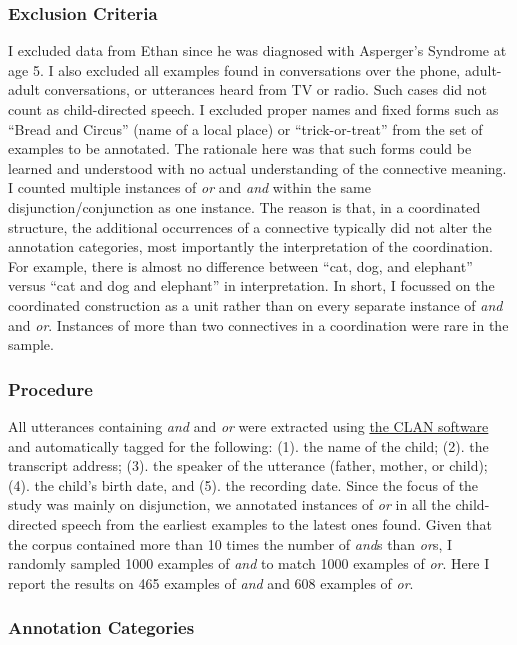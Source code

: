 \documentclass[oneside]{report}
\theoremstyle{definition}
\theoremstyle{definition}
\theoremstyle{definition}
\theoremstyle{remark}
\begin{document}
\subsubsection{Exclusion Criteria}\label{exclusion-criteria-1}

I excluded data from Ethan since he was diagnosed with Asperger's
Syndrome at age 5. I also excluded all examples found in conversations
over the phone, adult-adult conversations, or utterances heard from TV
or radio. Such cases did not count as child-directed speech. I excluded
proper names and fixed forms such as ``Bread and Circus'' (name of a
local place) or ``trick-or-treat'' from the set of examples to be
annotated. The rationale here was that such forms could be learned and
understood with no actual understanding of the connective meaning. I
counted multiple instances of \emph{or} and \emph{and} within the same
disjunction/conjunction as one instance. The reason is that, in a
coordinated structure, the additional occurrences of a connective
typically did not alter the annotation categories, most importantly the
interpretation of the coordination. For example, there is almost no
difference between ``cat, dog, and elephant'' versus ``cat and dog and
elephant'' in interpretation. In short, I focussed on the coordinated
construction as a unit rather than on every separate instance of
\emph{and} and \emph{or}. Instances of more than two connectives in a
coordination were rare in the sample.

\subsubsection{Procedure}\label{procedure-1}

All utterances containing \emph{and} and \emph{or} were extracted using
\href{http://alpha.talkbank.org/clan/}{the CLAN software} and
automatically tagged for the following: (1). the name of the child; (2).
the transcript address; (3). the speaker of the utterance (father,
mother, or child); (4). the child's birth date, and (5). the recording
date. Since the focus of the study was mainly on disjunction, we
annotated instances of \emph{or} in all the child-directed speech from
the earliest examples to the latest ones found. Given that the corpus
contained more than 10 times the number of \emph{and}s than \emph{or}s,
I randomly sampled 1000 examples of \emph{and} to match 1000 examples of
\emph{or}. Here I report the results on 465 examples of \emph{and} and
608 examples of \emph{or}.

\subsubsection{Annotation Categories}\label{annotation-categories}
\end{document}
